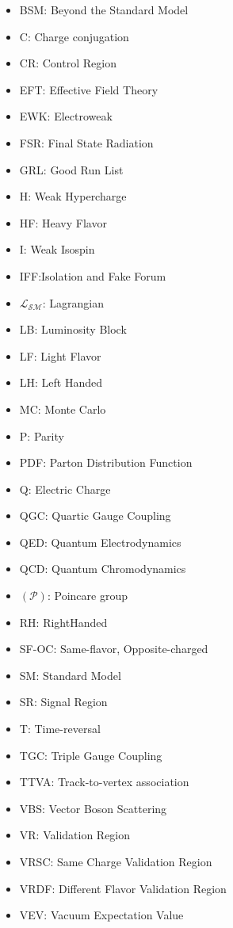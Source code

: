 \begin{itemize}
\item{BSM: Beyond the Standard Model}
\item{C: Charge conjugation}
\item{CR: Control Region}
\item{EFT: Effective Field Theory}
\item{EWK: Electroweak}
\item{FSR: Final State Radiation}
\item{GRL: Good Run List}
\item{H: Weak Hypercharge}
\item{HF: Heavy Flavor}
\item{I: Weak Isospin}
\item{IFF:Isolation and Fake Forum}
\item{$\mathcal{L_{SM}}$: Lagrangian}
\item{LB: Luminosity Block}
\item{LF: Light Flavor} 
\item{LH:  Left Handed}
\item{MC: Monte Carlo}
\item{P: Parity}
\item{PDF: Parton Distribution Function}
\item{Q: Electric Charge}
\item{QGC: Quartic Gauge Coupling}
\item{QED: Quantum Electrodynamics}
\item{QCD: Quantum Chromodynamics}
\item{$(\mathcal{P})$: Poincare group}
\item{RH: RightHanded}
\item{SF-OC: Same-flavor, Opposite-charged} 
\item{SM: Standard Model}
\item{SR: Signal Region}
\item{T: Time-reversal}
\item{TGC: Triple Gauge Coupling}
\item{TTVA: Track-to-vertex association}
\item{VBS: Vector Boson Scattering}
\item{VR: Validation Region}
\item{VRSC: Same Charge Validation Region}
\item{VRDF: Different Flavor Validation Region}
\item{VEV: Vacuum Expectation Value}
\end{itemize}